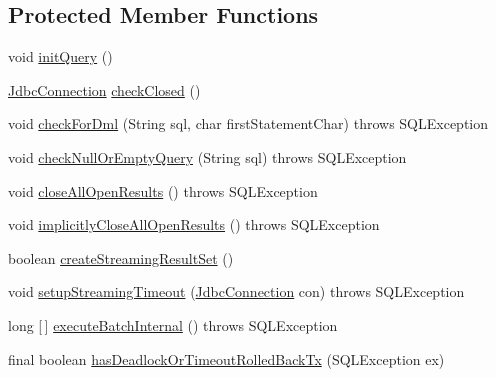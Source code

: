 \subsection*{Protected Member Functions}
\begin{DoxyCompactItemize}
\item 
void \mbox{\hyperlink{classcom_1_1mysql_1_1cj_1_1jdbc_1_1_statement_impl_a754a5bf5b0c4a83c123c657e6834d16c}{init\+Query}} ()
\item 
\mbox{\hyperlink{interfacecom_1_1mysql_1_1cj_1_1jdbc_1_1_jdbc_connection}{Jdbc\+Connection}} \mbox{\hyperlink{classcom_1_1mysql_1_1cj_1_1jdbc_1_1_statement_impl_abd738a18f0109b2305a642025eb4a3bb}{check\+Closed}} ()
\item 
void \mbox{\hyperlink{classcom_1_1mysql_1_1cj_1_1jdbc_1_1_statement_impl_a153a70521a7a239c1d6ad089f474d7ba}{check\+For\+Dml}} (String sql, char first\+Statement\+Char)  throws S\+Q\+L\+Exception 
\item 
void \mbox{\hyperlink{classcom_1_1mysql_1_1cj_1_1jdbc_1_1_statement_impl_ae8ad6b113e7dffaf4f20129eba328f7b}{check\+Null\+Or\+Empty\+Query}} (String sql)  throws S\+Q\+L\+Exception 
\item 
void \mbox{\hyperlink{classcom_1_1mysql_1_1cj_1_1jdbc_1_1_statement_impl_a471a61331072cf89533c58507ad21719}{close\+All\+Open\+Results}} ()  throws S\+Q\+L\+Exception 
\item 
void \mbox{\hyperlink{classcom_1_1mysql_1_1cj_1_1jdbc_1_1_statement_impl_a424894ae04079fd072300d7a54de6243}{implicitly\+Close\+All\+Open\+Results}} ()  throws S\+Q\+L\+Exception 
\item 
boolean \mbox{\hyperlink{classcom_1_1mysql_1_1cj_1_1jdbc_1_1_statement_impl_a4a514bb3e111c30e6b376b74bb8f78e8}{create\+Streaming\+Result\+Set}} ()
\item 
void \mbox{\hyperlink{classcom_1_1mysql_1_1cj_1_1jdbc_1_1_statement_impl_a04f28c7dc2d7b2c20ae6fad4301dd8fc}{setup\+Streaming\+Timeout}} (\mbox{\hyperlink{interfacecom_1_1mysql_1_1cj_1_1jdbc_1_1_jdbc_connection}{Jdbc\+Connection}} con)  throws S\+Q\+L\+Exception 
\item 
long \mbox{[}$\,$\mbox{]} \mbox{\hyperlink{classcom_1_1mysql_1_1cj_1_1jdbc_1_1_statement_impl_abd879bf637f7f3ba5e74050912735836}{execute\+Batch\+Internal}} ()  throws S\+Q\+L\+Exception 
\item 
final boolean \mbox{\hyperlink{classcom_1_1mysql_1_1cj_1_1jdbc_1_1_statement_impl_a5674003fcd332a1ac38d549b0b4c806e}{has\+Deadlock\+Or\+Timeout\+Rolled\+Back\+Tx}} (S\+Q\+L\+Exception ex)
\item 

\end{DoxyCompactItemize}
